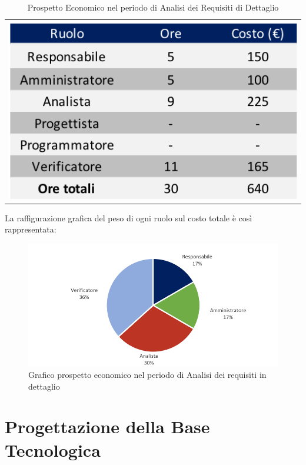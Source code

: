 \begin{table}[!ht]
	\begin{center}
		\begin{tabular}{c}
			\includegraphics{images/tabellaProspettoEconomicoDett.png}
		\end{tabular}
		\caption{Prospetto Economico nel periodo di Analisi dei Requisiti di Dettaglio}
	\end{center}
\end{table}

La raffigurazione grafica del peso di ogni ruolo sul costo totale è così rappresentata:
\begin{figure}[!ht]
	\begin{center}
		\includegraphics{images/grafoProspettoEconomicoDett.png}
		\caption{Grafico prospetto economico nel periodo di Analisi dei requisiti in dettaglio }
	\end{center}
\end{figure}

\newpage
\section{Progettazione della Base Tecnologica}
